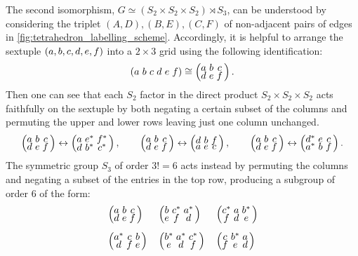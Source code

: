\documentclass[notitlepage, 10pt]{article}
\begin{document}
The second isomorphism, $G \simeq (S_2 \times S_2 \times S_2) \rtimes S_3$, can be understood by considering the triplet $(A,D), (B,E), (C,F)$ of non-adjacent pairs of edges in \cref{fig:tetrahedron_labelling_scheme}.
Accordingly, it is helpful to arrange the sextuple $(a,b,c,d,e,f)$ into a $2\times 3$ grid using the following identification:
\begin{equation}
    \left(\tightsextuple{\ea & \eb & \ec & \ed & \ee & \ef}\right)
    \cong
    \left(\tightsextuple{\ea & \eb & \ec \\ \ed & \ee & \ef}\right).
\end{equation}
Then one can see that each $S_2$ factor in the direct product $S_2 \times S_2 \times S_2$ acts faithfully on the sextuple by both negating a certain subset of the columns and permuting the upper and lower rows leaving just one column unchanged.
\begin{equation}
    \left(\tightsextuple{\ea & \eb & \ec \\ \ed & \ee & \ef}\right)
    \leftrightarrow
    \left(\tightsextuple{\ea & \ee^* & \ef^* \\ \ed & \eb^* & \ec^*}\right),
    \qquad
    \left(\tightsextuple{\ea & \eb & \ec \\ \ed & \ee & \ef}\right)
    \leftrightarrow
    \left(\tightsextuple{\ed & \eb & \ef \\ \ea & \ee & \ec}\right),
    \qquad
    \left(\tightsextuple{\ea & \eb & \ec \\ \ed & \ee & \ef}\right)
    \leftrightarrow
    \left(\tightsextuple{\ed^* & \ee & \ec \\ \ea^* & \eb & \ef}\right).
\end{equation}
The symmetric group $S_3$ of order $3! = 6$ acts instead by permuting the columns and negating a subset of the entries in the top row, producing a subgroup of order $6$ of the form:
\begin{equation}
    \begin{alignedat}{3}
        &\left(\tightsextuple{\ea & \eb & \ec \\ \ed & \ee & \ef}\right)
        \quad
        &&\left(\tightsextuple{\eb & \ec^* & \ea^* \\ \ee & \ef & \ed}\right)
        \quad
        &&\left(\tightsextuple{\ec^* & \ea & \eb^*  \\ \ef & \ed & \ee }\right)\\[0.5em]
        &\left(\tightsextuple{\ea^* & \ec & \eb \\ \ed & \ef & \ee}\right)
        \quad
        &&\left(\tightsextuple{\eb^* & \ea^*  & \ec^* \\ \ee & \ed & \ef}\right)
        \quad
        &&\left(\tightsextuple{\ec & \eb^* & \ea \\ \ef & \ee & \ed}\right)\\
    \end{alignedat}
\end{equation}
\end{document}
